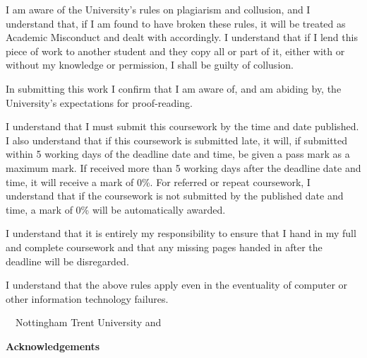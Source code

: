 \frontcover

\clearpage

I am aware of the University's rules on plagiarism and collusion, and I understand that, if I am found to have broken these rules, it will be treated as Academic Misconduct and dealt with accordingly. I understand that if I lend this piece of work to another student and they copy all or part of it, either with or without my knowledge or permission, I shall be guilty of collusion.

In submitting this work I confirm that I am aware of, and am abiding by, the University's expectations for proof-reading.

I understand that I must submit this coursework by the time and date published. I also understand that if this coursework is submitted late, it will, if submitted within 5 working days of the deadline date and time, be given a pass mark as a maximum mark. If received more than 5 working days after the deadline date and time, it will receive a mark of 0\%. For referred or repeat coursework, I understand that if the coursework is not submitted by the published date and time, a mark of 0\% will be automatically awarded.

I understand that it is entirely my responsibility to ensure that I hand in my full and complete coursework and that any missing pages handed in after the deadline will be disregarded.

I understand that the above rules apply even in the eventuality of computer or other information technology failures.

\vfill

\textcopyright~\session~Nottingham Trent University and~\fullname

\begin{dissertationabstract}
	
\end{dissertationabstract}

\clearpage
\begin{center}
	\textbf{Acknowledgements}
\end{center}


\tableofcontents

\clearpage

\listoffigures

\clearpage

\listoflistings

\clearpage

\listoftables

\clearpage

\printacronyms[name=List of Abbreviations]

\clearpage

